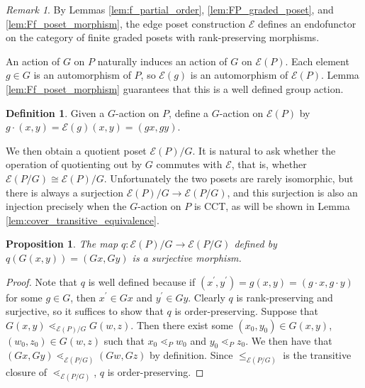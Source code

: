 \documentclass[smallextended, envcountsame, numbook]{svjour3}
\theoremstyle{plain}
\newtheorem{prop}[thm]{Proposition}
\theoremstyle{definition}
\newtheorem{defn}[thm]{Definition}
\theoremstyle{remark}
\newtheorem{rmk}[thm]{Remark}
\numberwithin{equation}{section}
\begin{document}
\begin{rmk}
By Lemmas \ref{lem:f_partial_order}, \ref{lem:FP_graded_poset}, and \ref{lem:Ff_poset_morphism}, the edge poset construction $\mathcal{E}$ defines an endofunctor on the category of finite graded posets with rank-preserving morphisms.
\end{rmk}



An action of $G$ on $P$ naturally induces an action of $G$ on $\mathcal E(P).$ Each element $g \in G$ is an automorphism of $P$, so $\mathcal E(g)$ is an automorphism of $\mathcal E(P)$. Lemma \ref{lem:Ff_poset_morphism} guarantees that this is a well defined group action. 


\begin{defn}\label{note:G_action_on_FP}
Given a $G$-action on $P$, define a $G$-action on $\mathcal E(P)$ by $g\cdot (x,y) = \mathcal{E}(g)(x,y) = (gx,gy)$.
\end{defn}

We then obtain a quotient poset $\mathcal E(P)/G$.  It is natural to ask whether the operation of quotienting out by $G$ commutes with $\mathcal E$, that is, whether $\mathcal E(P/G) \cong \mathcal E(P)/G$.  Unfortunately the two posets are rarely isomorphic, but there is always a surjection $\mathcal E(P)/G\rightarrow \mathcal E(P/G)$, and this surjection is also an injection precisely when the $G$-action on $P$ is CCT, as will be shown in Lemma \ref{lem:cover_transitive_equivalence}.


\begin{prop}\label{prop:surjection_between_F_quotients}
The map $q\colon \mathcal E(P)/G\rightarrow \mathcal E(P/G)$ defined by $q(G(x, y)) = (Gx,Gy)$ is a surjective morphism.
\end{prop}

\begin{proof}

Note that $q$ is well defined because if $(x^\prime, y^\prime) = g(x, y) = (g\cdot x, g\cdot y)$ for some $g\in G$, then $x^\prime\in Gx$ and $y^\prime\in Gy$.  Clearly $q$ is rank-preserving and surjective, so it suffices to show that $q$ is order-preserving.  Suppose that $G(x, y) \lessdot_{\mathcal E(P)/G} G(w, z)$.  Then there exist some $(x_0, y_0)\in G(x, y)$, $(w_0, z_0)\in G(w, z)$ such that $x_0\lessdot_P w_0$ and $y_0\lessdot_P z_0$.  We then have that $(Gx, Gy) \lessdot_{\mathcal E(P/G)} (Gw, Gz)$ by definition. Since $\le_{\mathcal E(P/G)}$ is the transitive closure of $\lessdot_{\mathcal E(P/G)}$, $q$ is order-preserving.
\end{proof}
\end{document}
